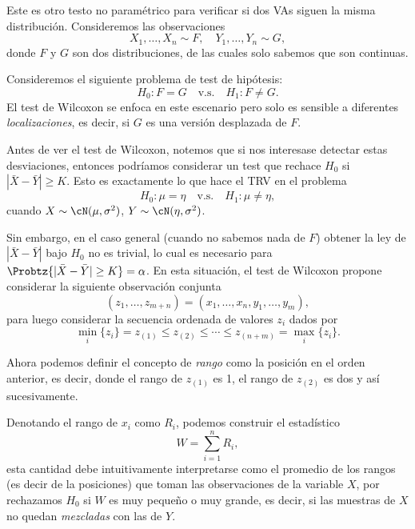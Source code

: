 Este es otro testo no paramétrico para verificar si dos VAs siguen la misma distribución. Consideremos las observaciones 
\begin{equation}
	X_1,\ldots,X_n\sim F,\quad Y_1,\ldots,Y_n\sim G,
\end{equation}
donde $F$ y $G$ son dos distribuciones, de las cuales solo sabemos que son continuas. 

Consideremos el siguiente problema de test de hipótesis: 
	\begin{equation}
		H_0:F=G\quad \text{v.s.}\quad H_1:F\neq G.
	\end{equation}
El test de Wilcoxon se enfoca en este escenario pero solo es sensible a diferentes \emph{localizaciones}, es decir, si $G$ es una versión desplazada de $F$.

Antes de ver el test de Wilcoxon, notemos que si nos interesase detectar estas desviaciones, entonces podríamos considerar un test que rechace $H_0$ si $|\bar{X} - \bar{Y}|\geq K$. Esto  es exactamente lo que hace el TRV en el problema 
	\begin{equation}
		H_0:\mu =  \eta \quad \text{v.s.}\quad H_1:\mu\neq \eta,
	\end{equation}
cuando $X\sim\cN(\mu,\sigma^2)$,  $Y\sim\cN(\eta,\sigma^2)$.

Sin embargo, en el caso general (cuando no sabemos nada de $F$) obtener la ley de $|\bar{X} - \bar{Y}|$ bajo $H_0$ no es trivial, lo cual es necesario para $\Probtz{|\bar{X} - \bar{Y}|\geq K} = \alpha$. En esta situación, el test de Wilcoxon propone considerar la siguiente observación conjunta 
\begin{equation}
	(z_1,\ldots,z_{m+n}) = (x_1,\ldots,x_n,y_1,\ldots,y_m),
\end{equation}
para luego considerar la secuencia ordenada de valores $z_i$ dados por 
\begin{equation}
	\min_i\{z_i\} = z_{(1)}\leq z_{(2)}\leq\cdots\leq z_{(n+m)} = \max_i\{z_i\}.
\end{equation}

Ahora podemos definir el concepto de \emph{rango} como la posición en el orden anterior, es decir, donde el rango de $z_{(1)}$ es 1, el rango de $z_{(2)}$ es dos  y así sucesivamente. 


Denotando el rango de $x_i$ como $R_i$, podemos construir el estadístico
\begin{equation}
 	W = \sum_{i=1}^{n}R_i,
 \end{equation} 
esta cantidad debe intuitivamente interpretarse como el promedio de los rangos (es decir de la posiciones) que toman las observaciones de la variable $X$, por rechazamos $H_0$ si $W$ es muy pequeño o muy grande, es decir, si las muestras de $X$ no quedan \emph{mezcladas} con las de $Y$. 

